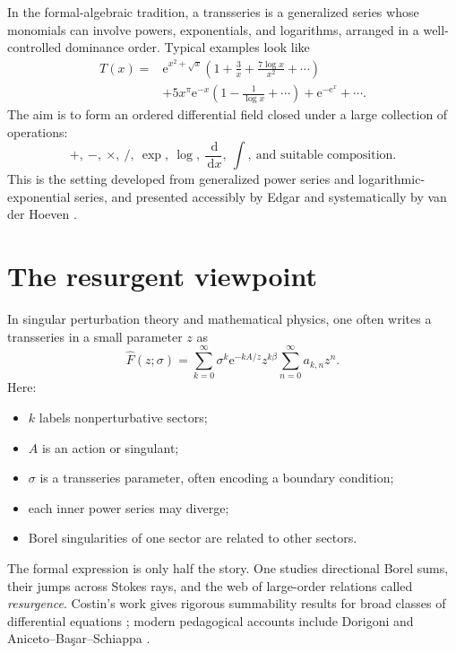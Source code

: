 \documentclass[11pt,openany]{book}
\theoremstyle{definition}
\theoremstyle{plain}
\theoremstyle{remark}
\newcommand{\dd}{\,\mathrm{d}}
\newcommand{\e}{\mathrm{e}}
\newcommand{\trans}[1]{\widehat{#1}}
\begin{document}
In the formal-algebraic tradition, a transseries is a generalized series whose monomials can involve powers, exponentials, and logarithms, arranged in a well-controlled dominance order. Typical examples look like
\begin{align*}
 T(x)={}&\e^{x^2+\sqrt{x}}
 \left(1+\frac{3}{x}+\frac{7\log x}{x^2}+\cdots\right)\\
 &+5x^{\pi}\e^{-x}
 \left(1-\frac1{\log x}+\cdots\right)
 +\e^{-\e^x}+\cdots.
\end{align*}
The aim is to form an ordered differential field closed under a large collection of operations:
\[
 +,\ - ,\ \times,\ /,\ \exp,\ \log,\ \frac{\dd}{\dd x},
 \ \int,\ \text{and suitable composition}.
\]
This is the setting developed from generalized power series and logarithmic-exponential series, and presented accessibly by Edgar \cite{edgar-beginners,edgar-composition} and systematically by van der Hoeven \cite{vdhoeven-book}.

\section{The resurgent viewpoint}

In singular perturbation theory and mathematical physics, one often writes a transseries in a small parameter $z$ as
\begin{equation}\label{eq:resurgent-template}
 \trans F(z;\sigma)
 =\sum_{k=0}^{\infty}\sigma^k
   \e^{-kA/z}z^{k\beta}
   \sum_{n=0}^{\infty}a_{k,n}z^n.
\end{equation}
Here:

\begin{itemize}
\item $k$ labels nonperturbative sectors;
\item $A$ is an action or singulant;
\item $\sigma$ is a transseries parameter, often encoding a boundary condition;
\item each inner power series may diverge;
\item Borel singularities of one sector are related to other sectors.
\end{itemize}

The formal expression is only half the story. One studies directional Borel sums, their jumps across Stokes rays, and the web of large-order relations called \emph{resurgence}. Costin's work gives rigorous summability results for broad classes of differential equations \cite{costin-1995,costin-1998,costin-book}; modern pedagogical accounts include Dorigoni \cite{dorigoni} and Aniceto--Ba\c{s}ar--Schiappa \cite{abs-primer}.
\end{document}

